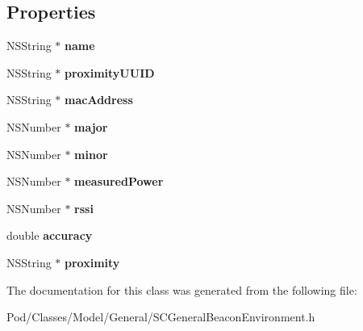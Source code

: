 \subsection*{Properties}
\begin{DoxyCompactItemize}
\item 
N\+S\+String $\ast$ {\bfseries name}\hypertarget{interface_s_c_general_beacon_environment_a5af51b519eeff144bbf628b83e4b6fc1}{}\label{interface_s_c_general_beacon_environment_a5af51b519eeff144bbf628b83e4b6fc1}

\item 
N\+S\+String $\ast$ {\bfseries proximity\+U\+U\+ID}\hypertarget{interface_s_c_general_beacon_environment_a0199552d7bfb5a10e9ffc020ee1d2eda}{}\label{interface_s_c_general_beacon_environment_a0199552d7bfb5a10e9ffc020ee1d2eda}

\item 
N\+S\+String $\ast$ {\bfseries mac\+Address}\hypertarget{interface_s_c_general_beacon_environment_a7f42c222f51893e630eff5b889fcb37f}{}\label{interface_s_c_general_beacon_environment_a7f42c222f51893e630eff5b889fcb37f}

\item 
N\+S\+Number $\ast$ {\bfseries major}\hypertarget{interface_s_c_general_beacon_environment_ad76643ca0f194343816f7c2043b56925}{}\label{interface_s_c_general_beacon_environment_ad76643ca0f194343816f7c2043b56925}

\item 
N\+S\+Number $\ast$ {\bfseries minor}\hypertarget{interface_s_c_general_beacon_environment_a1528b4327c020080da3736f5e247dfbc}{}\label{interface_s_c_general_beacon_environment_a1528b4327c020080da3736f5e247dfbc}

\item 
N\+S\+Number $\ast$ {\bfseries measured\+Power}\hypertarget{interface_s_c_general_beacon_environment_af8ee6f3c67985bd8e1025e36ffcdf97d}{}\label{interface_s_c_general_beacon_environment_af8ee6f3c67985bd8e1025e36ffcdf97d}

\item 
N\+S\+Number $\ast$ {\bfseries rssi}\hypertarget{interface_s_c_general_beacon_environment_ab446c51c4022c7c856e6835ca8fd722c}{}\label{interface_s_c_general_beacon_environment_ab446c51c4022c7c856e6835ca8fd722c}

\item 
double {\bfseries accuracy}\hypertarget{interface_s_c_general_beacon_environment_ab193d83dd8f52b47d31c609f13b4bd6a}{}\label{interface_s_c_general_beacon_environment_ab193d83dd8f52b47d31c609f13b4bd6a}

\item 
N\+S\+String $\ast$ {\bfseries proximity}\hypertarget{interface_s_c_general_beacon_environment_a6bcf5009568d8d3ca7635b8ece04decc}{}\label{interface_s_c_general_beacon_environment_a6bcf5009568d8d3ca7635b8ece04decc}

\end{DoxyCompactItemize}


The documentation for this class was generated from the following file\+:\begin{DoxyCompactItemize}
\item 
Pod/\+Classes/\+Model/\+General/S\+C\+General\+Beacon\+Environment.\+h\end{DoxyCompactItemize}
